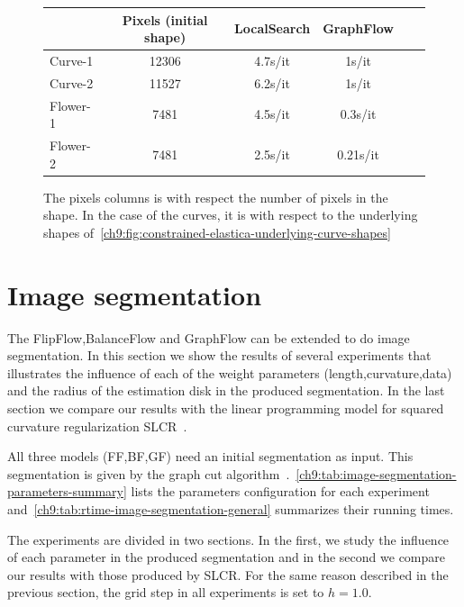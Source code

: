 \begin{figure}
\center
\captionsetup{type=table}
\begin{tabular}{|l|c|c|c|c|c|}
\hline
& Pixels (initial shape) & LocalSearch & GraphFlow \\
\hline
Curve-1 & 12306 & 4.7s/it & 1s/it\\
Curve-2 & 11527 & 6.2s/it & 1s/it\\
Flower-1  & 7481 & 4.5s/it & 0.3s/it \\
Flower-2 & 7481 & 2.5s/it & 0.21s/it\\
\hline
\end{tabular}
\caption{ The pixels columns is with respect the number of pixels in the shape. In the case of the curves, it is with respect to the underlying shapes of~\cref{ch9:fig:constrained-elastica-underlying-curve-shapes}}
\label{ch9:tab:rtime-constrained-elastica-general} 
\end{figure}


\section{Image segmentation}

The FlipFlow,BalanceFlow and GraphFlow can be extended to do image segmentation. In this section we show the results of several experiments that illustrates the influence of each of the weight parameters (length,curvature,data) and the radius of the estimation disk in the produced segmentation. In the last section we compare our results with the linear programming model for squared curvature regularization SLCR~\cite{schoenemann09linear}. 

All three models (FF,BF,GF) need an initial segmentation as input. This segmentation is given by the graph cut algorithm~\cite{boykov01graphcut}.~\cref{ch9:tab:image-segmentation-parameters-summary} lists the parameters configuration for each experiment and~\cref{ch9:tab:rtime-image-segmentation-general} summarizes their running times. 

The experiments are divided in two sections. In the first, we study the influence of each parameter in the produced segmentation and in the second we compare our results with those produced by SLCR. For the same reason described in the previous section, the grid step in all experiments is set to $h=1.0$.



